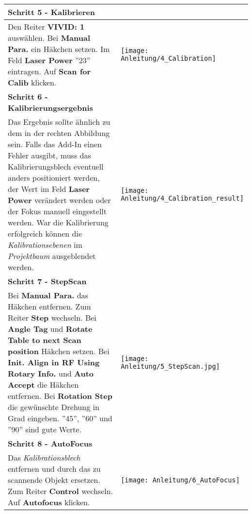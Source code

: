 \begin{longtable}{|>{\RaggedRight}m{5cm}|m{8cm}|}
\pagebreak 


\multicolumn{2}{|l|}%
{{\textbf{Schritt 5 - Kalibrieren}}}
\\ \hline
Den Reiter \textbf{VIVID: 1} auswählen.\linebreak
Bei \textbf{Manual Para.} ein Häkchen setzen.\linebreak
Im Feld \textbf{Laser Power} ''23'' eintragen.\linebreak
Auf \textbf{Scan for Calib} klicken.
& 
\texttt{[image: Anleitung/4\_Calibration]}
\\ \hline  

\multicolumn{2}{|l|}%
{{\textbf{Schritt 6 - Kalibrierungsergebnis}}}
\\ \hline
Das Ergebnis sollte ähnlich zu dem in der rechten Abbildung sein. \linebreak
Falls das Add-In einen Fehler ausgibt, muss das Kalibrierungsblech eventuell anders positioniert werden, der Wert im Feld \textbf{Laser Power} verändert werden oder der Fokus manuell eingestellt werden.\linebreak
War die Kalibrierung erfolgreich können die \emph{Kalibrationsebenen }im \emph{Projektbaum} ausgeblendet werden.
& 
\texttt{[image: Anleitung/4\_Calibration\_result]}
\\ \hline  

\pagebreak 


\multicolumn{2}{|l|}%
{{\textbf{Schritt 7 - StepScan}}}
\\ \hline
Bei \textbf{Manual Para.} das Häkchen entfernen.\linebreak
Zum Reiter \textbf{Step} wechseln.\linebreak
Bei \textbf{Angle Tag} und \textbf{Rotate Table to next Scan position} Häkchen setzen.\linebreak
Bei \textbf{Init. Align in RF Using Rotary Info.} und \textbf{Auto Accept} die Häkchen entfernen.\linebreak
Bei \textbf{Rotation Step} die gewünschte Drehung in Grad eingeben. \linebreak
''45'', ''60'' und ''90'' sind gute Werte.
& 
\texttt{[image: Anleitung/5\_StepScan.jpg]}
\\ \hline  

\multicolumn{2}{|l|}%
{{\textbf{Schritt 8 - AutoFocus}}}
\\ \hline
Das \emph{Kalibrationsblech} entfernen und durch das zu scannende Objekt ersetzen.\linebreak
Zum Reiter \textbf{Control} wechseln. \linebreak
Auf \textbf{Autofocus} klicken.\linebreak
& 
\texttt{[image: Anleitung/6\_AutoFocus]}
\\ \hline  


\end{longtable}
